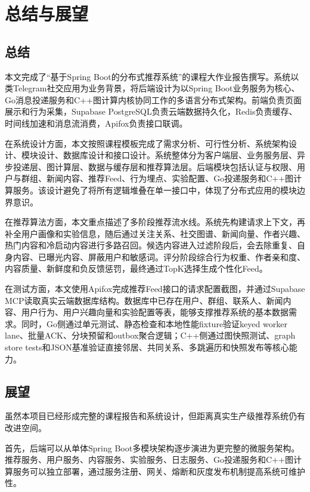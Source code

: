 
\chapter{总结与展望}

\section{总结}

本文完成了“基于Spring Boot的分布式推荐系统”的课程大作业报告撰写。系统以类Telegram社交应用为业务背景，将后端设计为以Spring Boot业务服务为核心、Go消息投递服务和C++图计算内核协同工作的多语言分布式架构。前端负责页面展示和行为采集，Supabase PostgreSQL负责云端数据持久化，Redis负责缓存、时间线加速和消息流消费，Apifox负责接口联调。

在系统设计方面，本文按照课程模板完成了需求分析、可行性分析、系统架构设计、模块设计、数据库设计和接口设计。系统整体分为客户端层、业务服务层、异步投递层、图计算层、数据与缓存层和推荐算法层。后端模块包括认证与权限、用户与群组、新闻内容、推荐Feed、行为埋点、实验配置、Go投递服务和C++图计算服务。该设计避免了将所有逻辑堆叠在单一接口中，体现了分布式应用的模块边界意识。

在推荐算法方面，本文重点描述了多阶段推荐流水线。系统先构建请求上下文，再补全用户画像和实验信息，随后通过关注关系、社交图谱、新闻向量、作者兴趣、热门内容和冷启动内容进行多路召回。候选内容进入过滤阶段后，会去除重复、自身内容、已曝光内容、屏蔽用户和敏感词。评分阶段综合行为权重、作者亲和度、内容质量、新鲜度和负反馈惩罚，最终通过TopK选择生成个性化Feed。

在测试方面，本文使用Apifox完成推荐Feed接口的请求配置截图，并通过Supabase MCP读取真实云端数据库结构。数据库中已存在用户、群组、联系人、新闻内容、用户行为、用户兴趣向量和实验配置等表，能够支撑推荐系统的基本数据需求。同时，Go侧通过单元测试、静态检查和本地性能fixture验证keyed worker lane、批量ACK、分块预留和outbox聚合逻辑；C++侧通过图快照测试、graph store tests和JSON基准验证直接邻居、共同关系、多跳遍历和快照发布等核心能力。

\section{展望}

虽然本项目已经形成完整的课程报告和系统设计，但距离真实生产级推荐系统仍有改进空间。

首先，后端可以从单体Spring Boot多模块架构逐步演进为更完整的微服务架构。推荐服务、用户服务、内容服务、实验服务、日志服务、Go投递服务和C++图计算服务可以独立部署，通过服务注册、网关、熔断和灰度发布机制提高系统可维护性。

